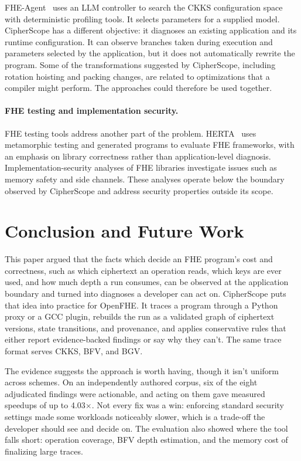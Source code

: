 \documentclass[sigconf,nonacm]{acmart}
\begin{document}
FHE-Agent~\cite{fheagent2025} uses an LLM controller to search the CKKS
configuration space with deterministic profiling tools. It selects parameters
for a supplied model. CipherScope has a different objective: it diagnoses an
existing application and its runtime configuration. It can observe branches
taken during execution and parameters selected by the application, but it does
not automatically rewrite the program. Some of the transformations suggested
by CipherScope, including rotation hoisting and packing changes, are related
to optimizations that a compiler might perform. The approaches could
therefore be used together.

\paragraph{FHE testing and implementation security.} FHE testing tools
address another part of the problem. HERTA~\cite{herta2026} uses metamorphic
testing and generated programs to evaluate FHE frameworks, with an emphasis on
library correctness rather than application-level diagnosis.
Implementation-security analyses of FHE libraries investigate issues such as
memory safety and side channels. These analyses operate below the boundary
observed by CipherScope and address security properties outside its scope.

\section{Conclusion and Future Work}
\label{sec:conclusion}

This paper argued that the facts which decide an FHE program's cost and
correctness, such as which ciphertext an operation reads, which keys are ever
used, and how much depth a run consumes, can be observed at the application
boundary and turned into diagnoses a developer can act on. CipherScope puts
that idea into practice for OpenFHE. It traces a program through a Python
proxy or a GCC plugin, rebuilds the run as a validated graph of ciphertext
versions, state transitions, and provenance, and applies conservative rules
that either report evidence-backed findings or say why they can't. The same
trace format serves CKKS, BFV, and BGV.

The evidence suggests the approach is worth having, though it isn't uniform
across schemes. On an independently authored corpus, six of the eight
adjudicated findings were actionable, and acting on them gave measured
speedups of up to 4.03$\times$. Not every fix was a win: enforcing standard
security settings made some workloads noticeably slower, which is a trade-off
the developer should see and decide on. The evaluation also showed where the
tool falls short: operation coverage, BFV depth estimation, and the memory
cost of finalizing large traces.
\end{document}
